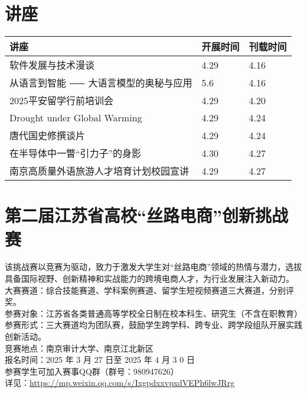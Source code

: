 \documentclass[letterpaper, 12pt]{article}
\begin{document}
\begin{multicols}{2}
\pagebreak

\section{讲座}
\begin{tabular}{|>{\centering\arraybackslash}m{}|m{}|m{}|}
    \hline
    讲座 & 开展时间 & 刊载时间\\
    \hline\hline
    软件发展与技术漫谈 & 4.29 & 4.16\\\hline
    从语言到智能 ⸺ 大语言模型的奥秘与应用 & 5.6 & 4.16\\\hline
    2025平安留学行前培训会 & 4.29 & 4.20\\\hline
    Drought under Global Warming & 4.29 & 4.24\\\hline
    唐代国史修撰谈片 & 4.29 & 4.24\\\hline
    在半导体中一瞥“引力子”的身影 & 4.30 & 4.27\\\hline
    南京高质量外语旅游人才培育计划校园宣讲 & 4.29 & 4.27\\\hline
\end{tabular}


\section{第二届江苏省高校“丝路电商”创新挑战赛} %
该挑战赛以竞赛为驱动，致力于激发大学生对“丝路电商”领域的热情与潜力，选拔具备国际视野、创新精神和实战能力的跨境电商人才，为行业发展注入新动力。
\\大赛赛道：综合技能赛道、学科案例赛道、留学生短视频赛道三大赛道，分别评奖。
\\参赛对象：江苏省各类普通高等学校全日制在校本科生、研究生（不含在职教育）
\\参赛形式：三大赛道均为团队赛，鼓励学生跨学科、跨专业、跨学段组队开展实践创新活动。
\\竞赛地点：南京审计大学、南京江北新区
\\报名时间：2025 年 3 月 27 日至 2025 年 4 月 3 0 日
\\参赛学生可加入赛事QQ群（群号：980947626）
\\详见：\url{https://mp.weixin.qq.com/s/IxgpdxxvpxdVEPh6lwJRrg}



\end{multicols}
\end{document}
